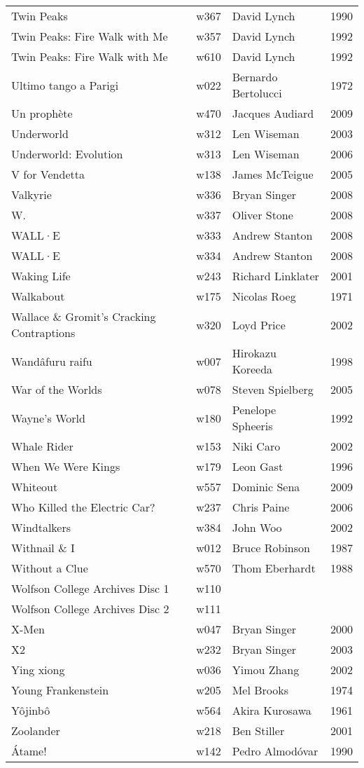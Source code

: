 \documentclass{article}
\begin{document}
\begin {center}
\begin{longtable}{p{10cm} l l l}
Twin Peaks & w367 & David Lynch & 1990 \\
Twin Peaks: Fire Walk with Me & w357 & David Lynch & 1992 \\
Twin Peaks: Fire Walk with Me & w610 & David Lynch & 1992 \\
Ultimo tango a Parigi & w022 & Bernardo Bertolucci & 1972 \\
Un prophète & w470 & Jacques Audiard & 2009 \\
Underworld & w312 & Len Wiseman & 2003 \\
Underworld: Evolution & w313 & Len Wiseman & 2006 \\
V for Vendetta & w138 & James McTeigue & 2005 \\
Valkyrie & w336 & Bryan Singer & 2008 \\
W. & w337 & Oliver Stone & 2008 \\
WALL·E & w333 & Andrew Stanton & 2008 \\
WALL·E & w334 & Andrew Stanton & 2008 \\
Waking Life & w243 & Richard Linklater & 2001 \\
Walkabout & w175 & Nicolas Roeg & 1971 \\
Wallace \& Gromit's Cracking Contraptions & w320 & Loyd Price & 2002 \\
Wandâfuru raifu & w007 & Hirokazu Koreeda & 1998 \\
War of the Worlds & w078 & Steven Spielberg & 2005 \\
Wayne's World & w180 & Penelope Spheeris & 1992 \\
Whale Rider & w153 & Niki Caro & 2002 \\
When We Were Kings & w179 & Leon Gast & 1996 \\
Whiteout & w557 & Dominic Sena & 2009 \\
Who Killed the Electric Car? & w237 & Chris Paine & 2006 \\
Windtalkers & w384 & John Woo & 2002 \\
Withnail \& I & w012 & Bruce Robinson & 1987 \\
Without a Clue & w570 & Thom Eberhardt & 1988 \\
Wolfson College Archives Disc 1 & w110 &  &  \\
Wolfson College Archives Disc 2 & w111 &  &  \\
X-Men & w047 & Bryan Singer & 2000 \\
X2 & w232 & Bryan Singer & 2003 \\
Ying xiong & w036 & Yimou Zhang & 2002 \\
Young Frankenstein & w205 & Mel Brooks & 1974 \\
Yôjinbô & w564 & Akira Kurosawa & 1961 \\
Zoolander & w218 & Ben Stiller & 2001 \\
Átame! & w142 & Pedro Almodóvar & 1990 \\
\hline
\end{longtable}
\end{center}
\end{document}
